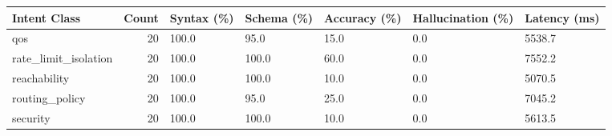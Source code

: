 \begin{tabular}{lrlllll}
\toprule
Intent Class & Count & Syntax (\%) & Schema (\%) & Accuracy (\%) & Hallucination (\%) & Latency (ms) \\
\midrule
qos & 20 & 100.0 & 95.0 & 15.0 & 0.0 & 5538.7 \\
rate_limit_isolation & 20 & 100.0 & 100.0 & 60.0 & 0.0 & 7552.2 \\
reachability & 20 & 100.0 & 100.0 & 10.0 & 0.0 & 5070.5 \\
routing_policy & 20 & 100.0 & 95.0 & 25.0 & 0.0 & 7045.2 \\
security & 20 & 100.0 & 100.0 & 10.0 & 0.0 & 5613.5 \\
\bottomrule
\end{tabular}
